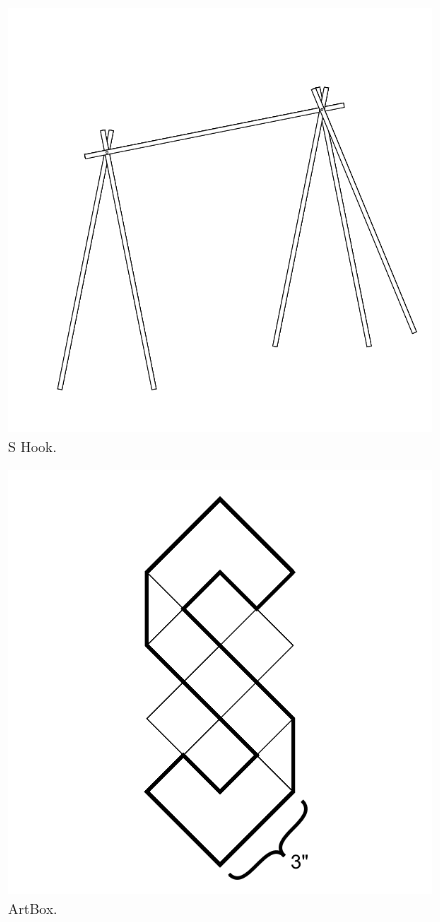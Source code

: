 \documentclass{report}
\begin{document}
\begin{figure}
	\centering
	\includegraphics[width=5in]{imageserver/uploadimages/image9.png}
	\caption{S Hook.}
\end{figure}

\begin{figure}
	\centering
	\includegraphics[width=5in]{imageserver/uploadimages/image10.png}
	\caption{ArtBox.}
\end{figure}
\end{document}
